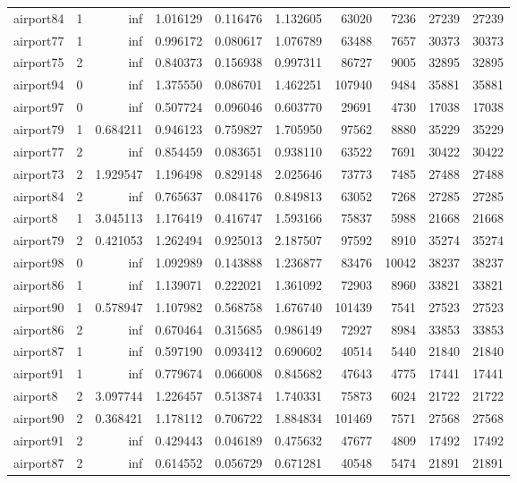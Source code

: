 \begin{longtable}{|l|r|r|r|r|r|r|r|r|r|}
airport84 & 1 & inf & 1.016129 & 0.116476 & 1.132605 & 63020 & 7236 & 27239 & 27239 \\
airport77 & 1 & inf & 0.996172 & 0.080617 & 1.076789 & 63488 & 7657 & 30373 & 30373 \\
airport75 & 2 & inf & 0.840373 & 0.156938 & 0.997311 & 86727 & 9005 & 32895 & 32895 \\
airport94 & 0 & inf & 1.375550 & 0.086701 & 1.462251 & 107940 & 9484 & 35881 & 35881 \\
airport97 & 0 & inf & 0.507724 & 0.096046 & 0.603770 & 29691 & 4730 & 17038 & 17038 \\
airport79 & 1 & 0.684211 & 0.946123 & 0.759827 & 1.705950 & 97562 & 8880 & 35229 & 35229 \\
airport77 & 2 & inf & 0.854459 & 0.083651 & 0.938110 & 63522 & 7691 & 30422 & 30422 \\
airport73 & 2 & 1.929547 & 1.196498 & 0.829148 & 2.025646 & 73773 & 7485 & 27488 & 27488 \\
airport84 & 2 & inf & 0.765637 & 0.084176 & 0.849813 & 63052 & 7268 & 27285 & 27285 \\
airport8 & 1 & 3.045113 & 1.176419 & 0.416747 & 1.593166 & 75837 & 5988 & 21668 & 21668 \\
airport79 & 2 & 0.421053 & 1.262494 & 0.925013 & 2.187507 & 97592 & 8910 & 35274 & 35274 \\
airport98 & 0 & inf & 1.092989 & 0.143888 & 1.236877 & 83476 & 10042 & 38237 & 38237 \\
airport86 & 1 & inf & 1.139071 & 0.222021 & 1.361092 & 72903 & 8960 & 33821 & 33821 \\
airport90 & 1 & 0.578947 & 1.107982 & 0.568758 & 1.676740 & 101439 & 7541 & 27523 & 27523 \\
airport86 & 2 & inf & 0.670464 & 0.315685 & 0.986149 & 72927 & 8984 & 33853 & 33853 \\
airport87 & 1 & inf & 0.597190 & 0.093412 & 0.690602 & 40514 & 5440 & 21840 & 21840 \\
airport91 & 1 & inf & 0.779674 & 0.066008 & 0.845682 & 47643 & 4775 & 17441 & 17441 \\
airport8 & 2 & 3.097744 & 1.226457 & 0.513874 & 1.740331 & 75873 & 6024 & 21722 & 21722 \\
airport90 & 2 & 0.368421 & 1.178112 & 0.706722 & 1.884834 & 101469 & 7571 & 27568 & 27568 \\
airport91 & 2 & inf & 0.429443 & 0.046189 & 0.475632 & 47677 & 4809 & 17492 & 17492 \\
airport87 & 2 & inf & 0.614552 & 0.056729 & 0.671281 & 40548 & 5474 & 21891 & 21891 \\

\end{longtable}
